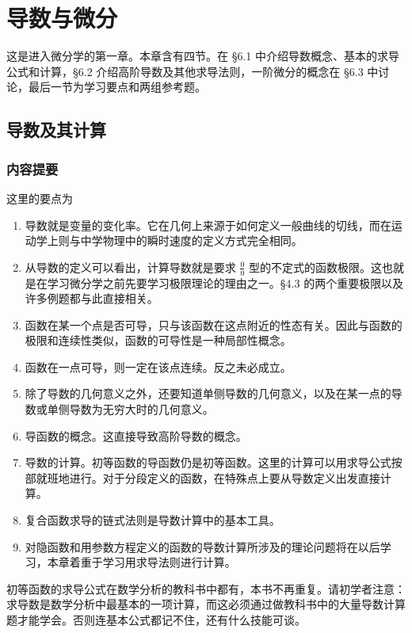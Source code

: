 \chapter{导数与微分}

这是进入微分学的第一章。本章含有四节。在 §6.1 中介绍导数概念、基本的求导公式和计算，§6.2 介绍高阶导数及其他求导法则，一阶微分的概念在 §6.3 中讨论，最后一节为学习要点和两组参考题。

\section{导数及其计算}

\subsection{内容提要}

这里的要点为
\begin{enumerate}
  \item 导数就是变量的变化率。它在几何上来源于如何定义一般曲线的切线，而在运动学上则与中学物理中的瞬时速度的定义方式完全相同。
  \item 从导数的定义可以看出，计算导数就是要求 $\frac{0}{0}$ 型的不定式的函数极限。这也就是在学习微分学之前先要学习极限理论的理由之一。§4.3 的两个重要极限以及许多例题都与此直接相关。
  \item 函数在某一个点是否可导，只与该函数在这点附近的性态有关。因此与函数的极限和连续性类似，函数的可导性是一种局部性概念。
  \item 函数在一点可导，则一定在该点连续。反之未必成立。
  \item 除了导数的几何意义之外，还要知道单侧导数的几何意义，以及在某一点的导数或单侧导数为无穷大时的几何意义。
  \item 导函数的概念。这直接导致高阶导数的概念。
  \item 导数的计算。初等函数的导函数仍是初等函数。这里的计算可以用求导公式按部就班地进行。对于分段定义的函数，在特殊点上要从导数定义出发直接计算。
  \item 复合函数求导的链式法则是导数计算中的基本工具。
  \item 对隐函数和用参数方程定义的函数的导数计算所涉及的理论问题将在以后学习，本章着重于学习用求导法则进行计算。
\end{enumerate}

初等函数的求导公式在数学分析的教科书中都有，本书不再重复。请初学者注意：求导数是数学分析中最基本的一项计算，而这必须通过做教科书中的大量导数计算题才能学会。否则连基本公式都记不住，还有什么技能可谈。

